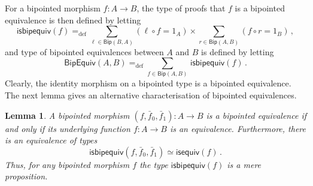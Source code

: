 \documentclass[10pt,a4paper,oneside,reqno]{amsart}
\numberwithin{equation}{section}
\theoremstyle{mythm}
\newtheorem{lemma}[theorem]{Lemma}
\theoremstyle{mydef}
\theoremstyle{myrmk}
\newcommand{\defeq}{=_{\mathrm{def}}}
\newcommand{\co}{\colon}
\newcommand{\isequiv}{\mathsf{isequiv}}
\newcommand{\BipHom}{\mathsf{Bip}}
\newcommand{\isbipequiv}{\mathsf{isbipequiv}}
\newcommand{\BipEquiv}{\mathsf{BipEquiv}}
\begin{document}
For a bipointed morphism $f \co A \to B$, the type of proofs that $f$ is a bipointed equivalence is
then defined by letting
\[
\isbipequiv(f) \defeq   \sum_{\ell \in \BipHom(B,A)} ( \ell \circ f = 1_A ) \times 
    \sum_{r \in \BipHom(A, B)}(  f \circ r = 1_B ) \, ,
\]
and type of bipointed equivalences between $A$ and $B$ is defined by letting
\[
\BipEquiv(A, B)
\defeq    
\sum_{f \in \BipHom(A,B)} \, \isbipequiv(f)  \, . 
\] 
Clearly, the identity morphism on a bipointed type is a bipointed equivalence. The next lemma
gives an alternative characterisation of bipointed equivalences.

\begin{lemma}\label{BoolAlgSpace}  \label{thm:usemere}
A bipointed morphism $(f, \bar{f}_0, \bar{f}_1) \co A \to B$ is a bipointed equivalence if and only
if its underlying function $f \co A \to B$ is an equivalence. Furthermore, there is an equivalence of types
\[
\isbipequiv(f, \bar{f}_0, \bar{f}_1)  \simeq \isequiv(f) \, . 
\]
Thus, for any bipointed morphism $f$ the type $\isbipequiv(f)$ is a mere proposition.
\end{lemma}  
\end{document}
